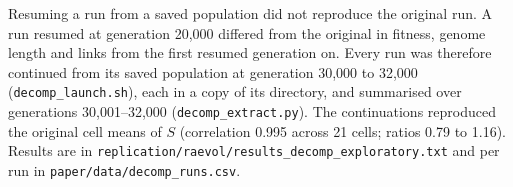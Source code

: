 Resuming a run from a saved population did not reproduce the original run. A run
resumed at generation 20{,}000 differed from the original in fitness, genome
length and links from the first resumed generation on. Every run was therefore
continued from its saved population at generation 30{,}000 to 32{,}000
(\texttt{decomp\_launch.sh}), each in a copy of its directory, and summarised over
generations 30{,}001--32{,}000 (\texttt{decomp\_extract.py}). The continuations
reproduced the original cell means of $S$ (correlation 0.995 across 21 cells;
ratios 0.79 to 1.16). Results are in
\texttt{replication/raevol/results\_decomp\_exploratory.txt} and per run in
\texttt{paper/data/decomp\_runs.csv}.


